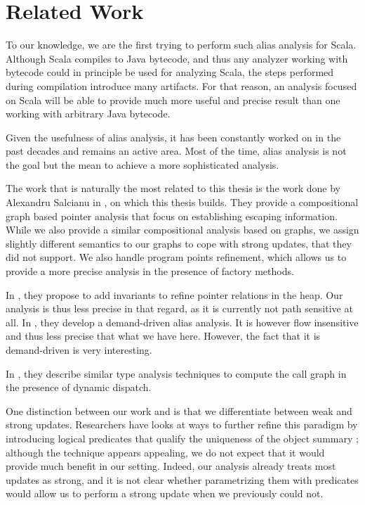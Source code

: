 \chapter{Related Work}
\label{chap:related}
To our knowledge, we are the first trying to perform such alias analysis for
Scala. Although Scala compiles to Java bytecode, and thus any analyzer working
with bytecode could in principle be used for analyzing Scala, the steps performed during
compilation introduce many artifacts. For that reason, an analysis focused on
Scala will be able to provide much more useful and precise result than one
working with arbitrary Java bytecode.

Given the usefulness of alias analysis, it has been constantly worked on in the
past decades and remains an active area. Most of the time, alias analysis is not
the goal but the mean to achieve a more sophisticated analysis.

The work that is naturally the most related to this thesis is the work done by
Alexandru Salcianu in \cite{Salcianu2001,Salcianu2006}, on which this thesis builds.
They provide a compositional graph based pointer analysis that
focus on establishing escaping information. While we also provide a similar
compositional analysis based on graphs, we assign slightly different semantics
to our graphs to cope with strong updates, that they did not support.  We also
handle program points refinement, which allows us to provide a more precise
analysis in the presence of factory methods.

In \cite{DBLP:conf/oopsla/DilligDA10}, they propose to add invariants to
refine pointer relations in the heap. Our analysis is thus less precise in
that regard, as it is currently not path sensitive at all. In
\cite{DBLP:conf/ecoop/ChalinJ07}, they develop a demand-driven alias analysis.
It is however flow insensitive and thus less precise that what we have here.
However, the fact that it is demand-driven is very interesting.

In
\cite{DBLP:conf/oopsla/DiwanMM96,DBLP:conf/oopsla/BaconS96,DBLP:conf/fossacs/JensenS01},
they describe similar type analysis techniques to compute the call graph in the
presence of dynamic dispatch.

One distinction between our work and \cite{Salcianu2006} is that we
differentiate between weak and strong updates. Researchers have looks at ways
to further refine this paradigm by introducing logical predicates that qualify
the uniqueness of the object summary \cite{DBLP:conf/esop/DilligDA10}; although
the technique appears appealing, we do not expect that it would provide much
benefit in our setting. Indeed, our analysis already treats most updates as
strong, and it is not clear whether parametrizing them with predicates would
allow us to perform a strong update when we previously could not.

